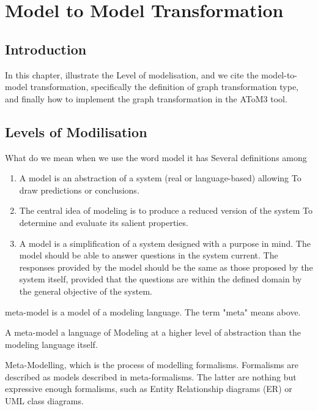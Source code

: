 \chapter{\label{cha: Graph Transformation}Model to Model Transformation}

\section{Introduction}
In this chapter, illustrate the Level of modelisation, and we cite the model-to-model transformation, specifically the definition of graph transformation type, and finally how to implement the graph transformation in the AToM3 tool.

\section{Levels of Modilisation}

What do we mean when we use the word model it has Several definitions among

\begin{enumerate}
\item A model is an abstraction of a system (real or language-based) allowing
To draw predictions or conclusions\cite{ch3-matters}. 
\item The central idea of modeling is to produce a reduced version of the system To determine and evaluate its salient properties\cite{ch3-selic}. 

\item A model is a simplification of a system designed with a purpose in mind.
The model should be able to answer questions in the system
current. The responses provided by the model should be the same as those proposed by the system itself, provided that the questions are within the defined domain by the general objective of the system\cite{ch3-def}.

\end{enumerate}

meta-model is a model of a modeling language. The term "meta" means above.

A meta-model a language of Modeling at a higher level of abstraction than the modeling language itself\cite{ch3-applied}.


Meta-Modelling, which is the process of modelling formalisms. 
Formalisms are described as models described in meta-formalisms. 
The latter are nothing but expressive enough formalisms, such as Entity Relationship diagrams (ER) or UML class diagrams.

